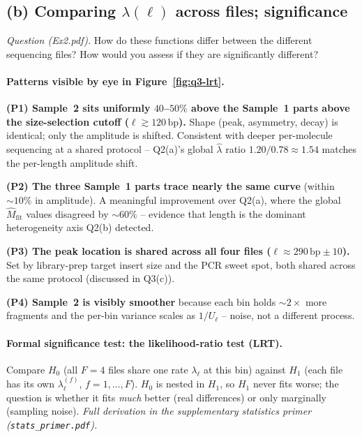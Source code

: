 \documentclass[11pt,a4paper]{article}
\newcommand{\hlam}{\hat{\lambda}}
\newcommand{\hM}{\hat{M}}
\begin{document}
\subsection{(b) Comparing $\lambda(\ell)$ across files; significance}
\emph{Question (Ex2.pdf).} How do these functions differ between the different
sequencing files? How would you assess if they are significantly different?

\paragraph{Patterns visible by eye in Figure~\ref{fig:q3-lrt}.}

\textbf{(P1) Sample~2 sits uniformly $40$--$50\%$ above the Sample~1 parts above
the size-selection cutoff ($\ell \gtrsim 120\,\text{bp}$).} Shape (peak,
asymmetry, decay) is identical; only the amplitude is shifted. Consistent with
deeper per-molecule sequencing at a shared protocol -- Q2(a)'s global $\hlam$
ratio $1.20/0.78 \approx 1.54$ matches the per-length amplitude shift.

\textbf{(P2) The three Sample~1 parts trace nearly the same curve} (within
$\sim 10\%$ in amplitude). A meaningful improvement over Q2(a), where the
global $\hM_{\text{fit}}$ values disagreed by $\sim 60\%$ -- evidence that
length is the dominant heterogeneity axis Q2(b) detected.

\textbf{(P3) The peak location is shared across all four files
($\ell \approx 290\,\text{bp} \pm 10$).} Set by library-prep target insert size
and the PCR sweet spot, both shared across the same protocol (discussed in Q3(c)).

\textbf{(P4) Sample~2 is visibly smoother} because each bin holds $\sim 2\times$
more fragments and the per-bin variance scales as $1/U_\ell$ -- noise, not a
different process.

\paragraph{Formal significance test: the likelihood-ratio test (LRT).}
Compare $H_0$ (all $F = 4$ files share one rate $\lambda_\ell$ at this bin)
against $H_1$ (each file has its own $\lambda_\ell^{(f)}$, $f = 1,\dots,F$).
$H_0$ is nested in $H_1$, so $H_1$ never fits worse; the question is whether
it fits \emph{much} better (real differences) or only marginally (sampling
noise). \emph{Full derivation in the supplementary statistics primer
(\texttt{stats\_primer.pdf}).}
\end{document}
